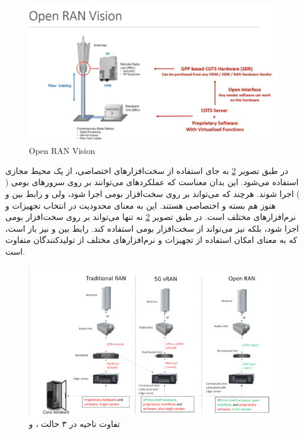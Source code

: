 \documentclass[landscape, 12pt]{report}
\begin{document}
\begin{figure}[ht]
	\centering
	\includegraphics[width=.6\linewidth]{Pic/Open_RAN_Vision}
	\caption{Open RAN Vision}
	\label{fig:Open_RAN_Vision}
\end{figure}

در
  طبق 
 تصویر \ref{fig:RAN_Area} به جای استفاده از سخت‌افزارهای اختصاصی، از یک محیط مجازی استفاده می‌شود. این بدان معناست که عملکردهای
   می‌توانند بر روی سرورهای بومی (
   ) اجرا شوند. هرچند که
     می‌تواند بر روی سخت‌افزار بومی اجرا شود، ولی
       و رابط بین
         و
           هنوز هم بسته و اختصاصی هستند. این به معنای محدودیت در انتخاب تجهیزات و نرم‌افزارهای مختلف است.
در
  طبق تصویر \ref{fig:RAN_Area} نه تنها
    می‌تواند بر روی سخت‌افزار بومی اجرا شود، بلکه
      نیز می‌تواند از سخت‌افزار بومی استفاده کند. رابط بین
        و
          نیز باز است، که به معنای امکان استفاده از تجهیزات و نرم‌افزارهای مختلف از تولیدکنندگان متفاوت است.



\begin{figure}[ht]
	\centering
	\includegraphics[width=.6\linewidth]{Pic/RAN_Area}
	\caption{تفاوت ناحیه 
		  در ۳ حالت
		   ،
		      و
		        }
	\label{fig:RAN_Area}
\end{figure}
\end{document}
